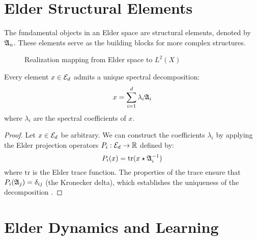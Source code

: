 \section{Elder Structural Elements}

The fundamental objects in an Elder space are structural elements, denoted by $\mathfrak{A}_{n}$. These elements serve as the building blocks for more complex structures.

\begin{figure}[htbp]
\centering
{}
\caption{Realization mapping from Elder space to $L^2(X)$}
\label{fig:realization-mapping}
\end{figure}

\begin{theorem}
Every element $x \in \mathcal{E}_{d}$ admits a unique spectral decomposition:
\begin{equation}
x = \sum_{i=1}^{d} \lambda_i \mathfrak{A}_{i}
\end{equation}
where $\lambda_i$ are the spectral coefficients of $x$.
\end{theorem}

\begin{proof}
Let $x \in \mathcal{E}_{d}$ be arbitrary. We can construct the coefficients $\lambda_i$ by applying the Elder projection operators $P_i : \mathcal{E}_{d} \to \mathbb{R}$ defined by:
\begin{equation}
P_i(x) = \text{tr}(x \star \mathfrak{A}_{i}^{-1})
\end{equation}
where $\text{tr}$ is the Elder trace function. The properties of the trace ensure that $P_i(\mathfrak{A}_{j}) = \delta_{ij}$ (the Kronecker delta), which establishes the uniqueness of the decomposition \cite{elder_mentor_erudite}.
\end{proof}

\section{Elder Dynamics and Learning}

